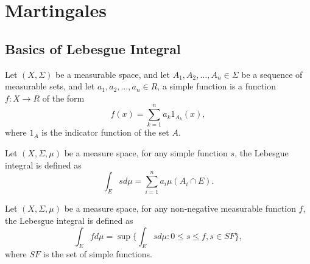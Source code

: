\chapter{Martingales}

\section{Basics of Lebesgue Integral}

\begin{definition}
Let $(X,\Sigma)$ be a measurable space, and let $A_1,A_2,\dots,A_n\in \Sigma$
be a sequence of measurable sets, and let $a_1,a_2,\dots,a_n\in R$, a 
simple function is a function $f:X\to R$ of the form
\begin{equation}
  f(x)= \sum_{k=1}^n a_k 1_{A_k}(x),
\end{equation}
where $1_A$ is the indicator function of the set $A$.
\end{definition}

\begin{definition}
Let $(X,\Sigma,\mu)$ be a measure space, for any simple function $s$, 
the Lebesgue integral is defined as
\begin{equation}
  \int_E s d\mu = \sum_{i=1}^n a_i \mu(A_i \cap E).
\end{equation}
\end{definition}

\begin{definition}
Let $(X,\Sigma,\mu)$ be a measure space, 
for any non-negative measurable function $f$, the Lebesgue integral is defined
as
\begin{equation}
  \int_E f d\mu = \sup \{ \int_E s d\mu: 0\le s\le f, s \in SF \},
\end{equation}
where $SF$ is the set of simple functions.
\end{definition}

